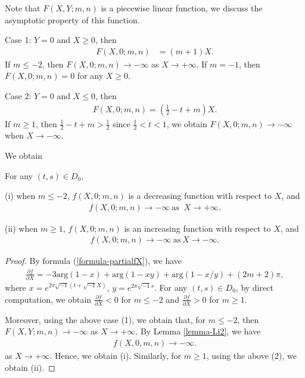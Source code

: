 \documentclass[12pt]{amsart}
\begin{document}
  Note that $F(X,Y;m,n)$ is a piecewise linear function, we discuss the asymptotic property of this function.
  
Case 1: $Y=0$ and $X\geq 0$, then
\begin{align}
F(X,0;m,n)&=(m+1)X.
\end{align}
If $m\leq -2$, then $ F(X,0;m,n)\rightarrow -\infty$ as $X\rightarrow +\infty$. 
If $m=-1$,  then $ F(X,0;m,n)=0$ for any $X\geq 0$.

Case 2: $Y=0$ and $X\leq 0$, then 
\begin{align}
    F(X,0;m,n)=\left(\frac{1}{2}-t+m\right)X.
\end{align}
If $m\geq 1$, then $\frac{1}{2}-t+m>\frac{1}{2}$ since $\frac{1}{2}<t<1$, we obtain
$ F(X,0;m,n)\rightarrow -\infty$ when $X\rightarrow -\infty$. 




We obtain
\begin{lemma} \label{lemma-m-2m1}
For any $(t,s)\in D_0$, 

(i) when $m\leq -2$,  $f(X,0;m,n)$ is a decreasing  function with respect to $X$, and
\begin{align}
    f(X,0;m,n)\rightarrow -\infty \ \text{as } \ X\rightarrow +\infty.
\end{align}

(ii) when $m\geq 1$,  $f(X,0;m,n)$ is an increasing  function with respect to $X$, and
\begin{align}
    f(X,0;m,n)\rightarrow -\infty \ \text{as} \ X\rightarrow -\infty. 
\end{align}
\end{lemma}
\begin{proof}
By formula (\ref{formula-partialfX}), we have 
\begin{align}
\frac{\partial f}{\partial X}=    -3\text{arg}(1-x)+\text{arg}(1-xy)+\text{arg}(1-x/y)+(2m+2)\pi,
\end{align}
where $x=e^{2\pi\sqrt{-1}(t+\sqrt{-1}X)}$, $y=e^{2\pi\sqrt{-1}s}$. 
For any $(t,s)\in D_0$, by direct computation, we obtain $\frac{\partial f}{\partial X}<0    $ for $m\leq -2$ and $
\frac{\partial f}{\partial X}>0    
$ for $m\geq 1$. 

Moreover, using the above case (1), we obtain that, for $m\leq -2$, then $F(X,Y;m,n)\rightarrow -\infty$ as $X\rightarrow +\infty$. By Lemma \ref{lemma-Li2}, we have 
       \begin{align}
           f(X,0,m,n)\rightarrow -\infty.
       \end{align}
      as $X\rightarrow +\infty$.  Hence, we obtain (i).  
    Similarly, for $m\geq 1$,  using the above (2), we obtain (ii). 
\end{proof}
 
\end{document}
